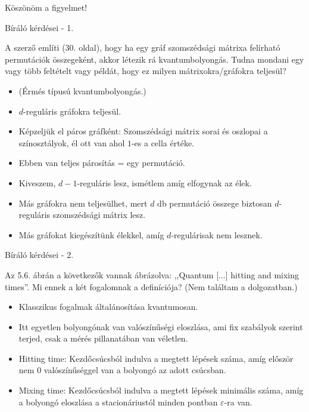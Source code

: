 \documentclass[aspectratio=169]{beamer}
\begin{document}
\begin{frame}
\begin{center}
\begin{LARGE}
Köszönöm a figyelmet!
\end{LARGE}
\end{center}
\end{frame}

\begin{frame}{Bíráló kérdései - 1.}

A szerző említi (30. oldal), hogy ha egy gráf szomszédsági mátrixa felírható permutációk összegeként, akkor létezik rá kvantumbolyongás. Tudna mondani egy vagy több feltételt vagy példát, hogy ez milyen mátrixokra/gráfokra teljesül?

\begin{itemize}
  \item (Érmés típusú kvantumbolyongás.)
  \item $d$-reguláris gráfokra teljesül.
  \item Képzeljük el páros gráfként: Szomszédsági mátrix sorai és oszlopai a színosztályok, él ott van ahol $1$-es a cella értéke.
  \item Ebben van teljes párosítás = egy permutáció.
  \item Kiveszem, $d-1$-reguláris lesz, ismétlem amíg elfogynak az élek.
  \item Más gráfokra nem teljesülhet, mert $d$ db permutáció összege biztosan $d$-reguláris szomszédsági mátrix lesz.
  \item Más gráfokat kiegészítünk élekkel, amíg $d$-regulárisak nem lesznek.
\end{itemize}

\end{frame}

\begin{frame}{Bíráló kérdései - 2.}

Az 5.6. ábrán a következők vannak ábrázolva: ,,Quantum [...] hitting and mixing times''. Mi ennek a két fogalomnak a definíciója? (Nem találtam a dolgozatban.)

\begin{itemize}
  \item Klasszikus fogalmak általánosítása kvantumosan.
  \item Itt egyetlen bolyongónak van valószínűségi eloszlása, ami fix szabályok szerint terjed, csak a mérés pillanatában van véletlen.
  \item Hitting time: Kezdőcsúcsból indulva a megtett lépések száma, amíg először nem $0$ valószínűséggel van a bolyongó az adott csúcsban.
  \item Mixing time: Kezdőcsúcsból indulva a megtett lépések minimális száma, amíg a bolyongó eloszlása a stacionáriustól minden pontban $\varepsilon$-ra van.
\end{itemize}

\end{frame}
\end{document}
